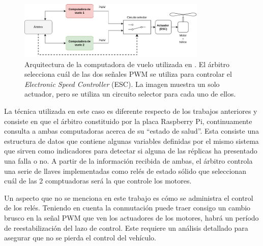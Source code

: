 \begin{figure}[htb]
    \centering
    \includegraphics[width=0.8\textwidth]{img/ROS_redundancy.png}
    \caption{Arquitectura de la computadora de vuelo utilizada en \cite{thesis_redundant_ROS}. El árbitro selecciona cuál de las dos señales PWM se utiliza para controlar el \textit{Electronic Speed Controller} (ESC). La imagen muestra un solo actuador, pero se utiliza un circuito selector para cada uno de ellos.}
    \label{fig:ROS_redundancy}
\end{figure}

La técnica utilizada en este caso es diferente respecto de los trabajos anteriores y consiste en que el árbitro constituido por la placa Raspberry Pi, continuamente consulta a ambas computadoras acerca de su ``estado de salud''. Esta consiste una estructura de datos que contiene algunas variables definidas por el mismo sistema que sirven como indicadores para detectar si alguna de las réplicas ha presentado una falla o no. A partir de la información recibida de ambas, el árbitro controla una serie de llaves implementadas como relés de estado sólido que seleccionan cuál de las 2 comptuadoras será la que controle los motores.

Un aspecto que no se menciona en este trabajo es cómo se administra el control de los relés. Teniendo en cuenta la conmutación puede traer consigo un cambio brusco en la señal PWM que ven los actuadores de los motores, habrá un período de reestabilización del lazo de control. Este requiere un análisis detallado para asegurar que no se pierda el control del vehículo.




